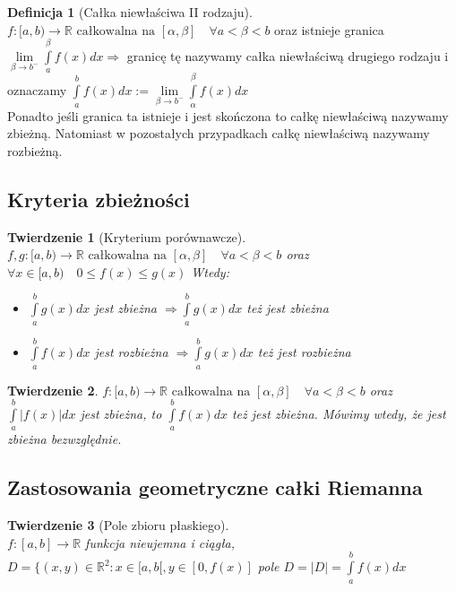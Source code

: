\documentclass[12pt,a4paper]{article}
\newtheorem{tw}{Twierdzenie}
\theoremstyle{definition}
\newtheorem{df}{Definicja}
\begin{document}
\begin{df}[Całka niewłaściwa II rodzaju]~\\
$f: [a, b) \to \mathbb{R} \text{ całkowalna na } [\alpha, \beta] \quad \forall a < \beta < b$ oraz istnieje granica $\lim\limits_{\beta\to b^-} \int\limits_a^\beta f(x)dx \Rightarrow$ granicę tę nazywamy całka niewłaściwą drugiego rodzaju i oznaczamy $\int\limits_a^b f(x)dx := \lim\limits_{\beta\to b^-} \int\limits_\alpha^\beta f(x)dx$\\
Ponadto jeśli granica ta istnieje i jest skończona to całkę niewłaściwą nazywamy zbieżną. Natomiast w pozostałych przypadkach całkę niewłaściwą nazywamy rozbieżną.
\end{df}

\subsection{Kryteria zbieżności}

\begin{tw}[Kryterium porównawcze]~\\
$f,g: [a,b) \to \mathbb{R} \text{ całkowalna na } [\alpha, \beta] \quad \forall a < \beta < b$ oraz
$\forall x\in [a,b) \quad 0 \leqslant f(x) \leqslant g(x)$ Wtedy:
\begin{itemize}
\item $\int\limits_a^bg(x)dx$ jest zbieżna $\Rightarrow \int\limits_a^bg(x)dx$ też jest zbieżna
\item $\int\limits_a^bf(x)dx$ jest rozbieżna $\Rightarrow \int\limits_a^bg(x)dx$ też jest rozbieżna
\end{itemize}
\end{tw}

\begin{tw}
$f: [a,b) \to \mathbb{R} \text{ całkowalna na } [\alpha, \beta] \quad \forall a < \beta < b$ oraz
$\int\limits_a^b |f(x)|dx$ jest zbieżna, to $\int\limits_a^b f(x)dx$ też jest zbieżna. Mówimy wtedy, że jest zbieżna bezwzględnie.
\end{tw} 

\subsection{Zastosowania geometryczne całki Riemanna}

\begin{tw}[Pole zbioru płaskiego]~\\
$f: [a,b] \to \mathbb{R}$ funkcja nieujemna i ciągła, $D = \{(x,y) \in \mathbb{R}^2: x\in [a,b[, y\in [0, f(x)]$
pole $D = |D| = \int\limits_a^b f(x)dx$
\end{tw}
\end{document}
